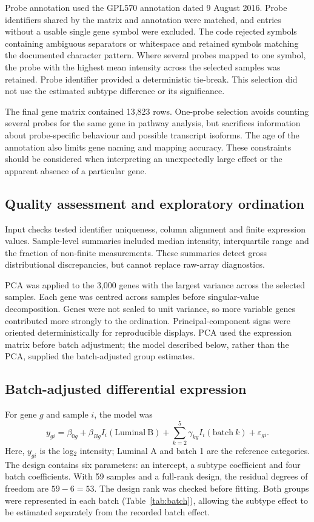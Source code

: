 \documentclass[11pt,a4paper]{article}
\begin{document}
Probe annotation used the GPL570 annotation dated 9 August 2016. Probe identifiers shared by the matrix and annotation were matched, and entries without a usable single gene symbol were excluded. The code rejected symbols containing ambiguous separators or whitespace and retained symbols matching the documented character pattern. Where several probes mapped to one symbol, the probe with the highest mean intensity across the selected samples was retained. Probe identifier provided a deterministic tie-break. This selection did not use the estimated subtype difference or its significance.

The final gene matrix contained 13,823 rows. One-probe selection avoids counting several probes for the same gene in pathway analysis, but sacrifices information about probe-specific behaviour and possible transcript isoforms. The age of the annotation also limits gene naming and mapping accuracy. These constraints should be considered when interpreting an unexpectedly large effect or the apparent absence of a particular gene.

\subsection{Quality assessment and exploratory ordination}
Input checks tested identifier uniqueness, column alignment and finite expression values. Sample-level summaries included median intensity, interquartile range and the fraction of non-finite measurements. These summaries detect gross distributional discrepancies, but cannot replace raw-array diagnostics.

PCA was applied to the 3,000 genes with the largest variance across the selected samples. Each gene was centred across samples before singular-value decomposition. Genes were not scaled to unit variance, so more variable genes contributed more strongly to the ordination. Principal-component signs were oriented deterministically for reproducible displays. PCA used the expression matrix before batch adjustment; the model described below, rather than the PCA, supplied the batch-adjusted group estimates.

\subsection{Batch-adjusted differential expression}
For gene $g$ and sample $i$, the model was
\begin{equation}
y_{gi}=\beta_{0g}+\beta_{Bg}I_i(\mathrm{Luminal\ B})+
\sum_{k=2}^{5}\gamma_{kg}I_i(\mathrm{batch}\ k)+\varepsilon_{gi}.
\label{eq:model}
\end{equation}
Here, $y_{gi}$ is the log$_2$ intensity; Luminal A and batch 1 are the reference categories. The design contains six parameters: an intercept, a subtype coefficient and four batch coefficients. With 59 samples and a full-rank design, the residual degrees of freedom are $59-6=53$. The design rank was checked before fitting. Both groups were represented in each batch (Table~\ref{tab:batch}), allowing the subtype effect to be estimated separately from the recorded batch effect.
\end{document}
